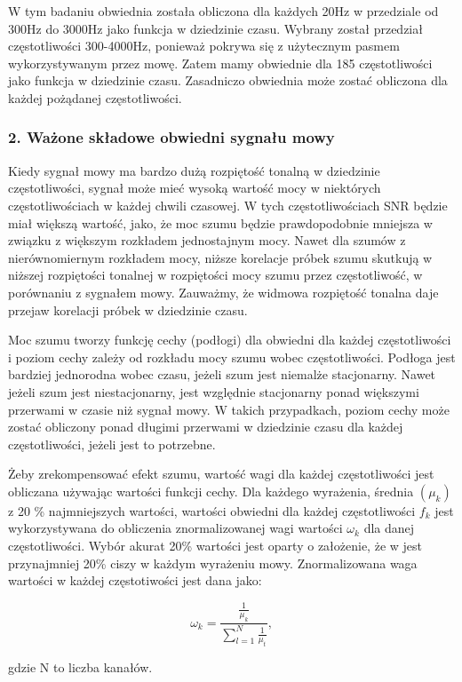 \documentclass[eng,printmode]{mgr}
\begin{document}
  W tym badaniu obwiednia została obliczona dla każdych 20Hz w przedziale od 300Hz do 3000Hz jako funkcja w dziedzinie czasu. Wybrany został przedział częstotliwości 300-4000Hz, ponieważ pokrywa się z użytecznym pasmem wykorzystywanym przez mowę. Zatem mamy obwiednie dla 185 częstotliwości jako funkcja w dziedzinie czasu. Zasadniczo obwiednia może zostać obliczona dla każdej pożądanej częstotliwości.
  
  \subsubsection{2. Ważone składowe obwiedni sygnału mowy}
  Kiedy sygnał mowy ma bardzo dużą rozpiętość tonalną w dziedzinie częstotliwości, sygnał może mieć wysoką wartość mocy w niektórych częstotliwościach w każdej chwili czasowej. W tych częstotliwościach SNR będzie miał większą wartość, jako, że moc szumu będzie prawdopodobnie mniejsza w związku z większym rozkładem jednostajnym mocy. Nawet dla szumów z nierównomiernym rozkładem mocy, niższe korelacje próbek szumu skutkują w niższej rozpiętości tonalnej w rozpiętości mocy szumu przez częstotliwość, w porównaniu z sygnałem mowy. Zauważmy, że widmowa rozpiętość tonalna daje przejaw korelacji próbek w dziedzinie czasu. 
  
  Moc szumu tworzy funkcję cechy (podłogi) dla obwiedni dla każdej częstotliwości i poziom cechy zależy od rozkładu mocy szumu wobec częstotliwości. Podłoga jest bardziej jednorodna wobec czasu, jeżeli szum jest niemalże stacjonarny. Nawet jeżeli szum jest niestacjonarny, jest względnie stacjonarny ponad większymi przerwami w czasie niż sygnał mowy. W takich przypadkach, poziom cechy może zostać obliczony ponad długimi przerwami w dziedzinie czasu dla każdej częstotliwości, jeżeli jest to potrzebne.
  
  Żeby zrekompensować efekt szumu, wartość wagi dla każdej częstotliwości jest obliczana używając wartości funkcji cechy. Dla każdego wyrażenia, średnia $(\mu_{k})$ z 20 \% najmniejszych wartości, wartości obwiedni dla każdej częstotliwości $f_{k}$ jest wykorzystywana do obliczenia znormalizowanej wagi wartości $\omega_{k}$ dla danej częstotliwości. Wybór akurat 20\% wartości jest oparty o założenie, że w jest przynajmniej 20\% ciszy w każdym wyrażeniu mowy. Znormalizowana waga wartości w każdej częstotiwości jest dana jako:
  
  
  $$\omega_{k} = \frac{\frac{1}{\mu_{k}}}{\sum_{l=1}^{N}	\frac{1}{\mu_{t}}},$$
  
  gdzie N to liczba kanałów.
  
\end{document}
